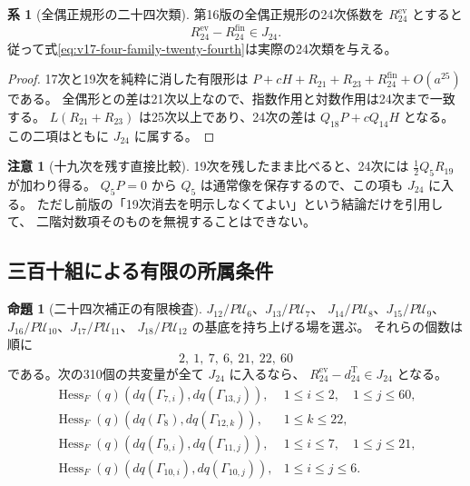 \documentclass[a4paper,11pt]{ltjsarticle}
\theoremstyle{definition}
\newtheorem{remark}[theorem]{注意}
\newtheorem{proposition}[theorem]{命題}
\newtheorem{corollary}[theorem]{系}
\begin{document}
\begin{corollary}[全偶正規形の二十四次類]
\label{cor:v17-evenization-twenty-fourth-class}
第16版の全偶正規形の24次係数を $R_{24}^{\mathrm{ev}}$ とすると
\[
                   R_{24}^{\mathrm{ev}}-R_{24}^{\mathrm{fin}}\in J_{24}.
\]
従って式\eqref{eq:v17-four-family-twenty-fourth}は実際の24次類を与える。
\end{corollary}

\begin{proof}
17次と19次を純粋に消した有限形は
$P+cH+R_{21}+R_{23}+R_{24}^{\mathrm{fin}}+O(a^{25})$ である。
全偶形との差は21次以上なので、指数作用と対数作用は24次まで一致する。
$L(R_{21}+R_{23})$ は25次以上であり、24次の差は $Q_{18}P+cQ_{14}H$ となる。
この二項はともに $J_{24}$ に属する。
\end{proof}

\begin{remark}[十九次を残す直接比較]
19次を残したまま比べると、24次には
$\tfrac12Q_5R_{19}$ が加わり得る。
$Q_5P=0$ から $Q_5$ は通常像を保存するので、この項も $J_{24}$ に入る。
ただし前版の「19次消去を明示しなくてよい」という結論だけを引用して、
二階対数項そのものを無視することはできない。
\end{remark}

\subsection{三百十組による有限の所属条件}

\begin{proposition}[二十四次補正の有限検査]
\label{prop:v17-three-hundred-ten-pairings}
$J_{12}/P\mathcal U_6$、$J_{13}/P\mathcal U_7$、
$J_{14}/P\mathcal U_8$、$J_{15}/P\mathcal U_9$、
$J_{16}/P\mathcal U_{10}$、$J_{17}/P\mathcal U_{11}$、
$J_{18}/P\mathcal U_{12}$ の基底を持ち上げる場を選ぶ。
それらの個数は順に
\[
                         2,\ 1,\ 7,\ 6,\ 21,\ 22,\ 60
\]
である。次の310個の共変量が全て $J_{24}$ に入るなら、
$R_{24}^{\mathrm{ev}}-d_{24}^{\mathrm T}\in J_{24}$ となる。
\[
\begin{array}{ll}
 \operatorname{Hess}_F(q)(dq(\Gamma_{7,i}),dq(\Gamma_{13,j})),
       &1\le i\le2,\quad1\le j\le60,\\
 \operatorname{Hess}_F(q)(dq(\Gamma_8),dq(\Gamma_{12,k})),
       &1\le k\le22,\\
 \operatorname{Hess}_F(q)(dq(\Gamma_{9,i}),dq(\Gamma_{11,j})),
       &1\le i\le7,\quad1\le j\le21,\\
 \operatorname{Hess}_F(q)(dq(\Gamma_{10,i}),dq(\Gamma_{10,j})),
       &1\le i\le j\le6.
\end{array}
\]
\end{proposition}
\end{document}
